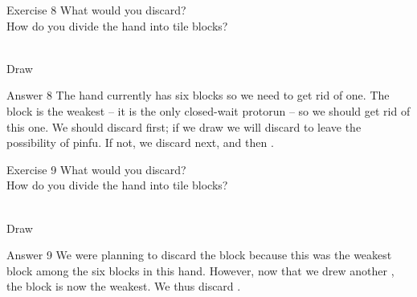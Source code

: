\bigskip

\begin{itembox}[l]{Exercise 8}
What would you discard? \\
\vsp
How do you divide the hand into tile blocks? 

\bp
{}~\\
\hfill\footnotesize{Draw~~~~~~~~~~~}
\ep
\end{itembox}

\newpage

\begin{itembox}[r]{Answer 8}
\emj
The hand currently has six blocks so we need to get rid of one. The {\LARGE{}} block is the weakest -- it is the only closed-wait protorun -- so we should get rid of this one. We should discard {\LARGE{}} first; if we draw {\LARGE{}} we will discard {\LARGE{}} to leave the possibility of {\jap pinfu}. If not, we discard {\LARGE{}} next, and then  {\LARGE{}}. 
\end{itembox}

\vfill

\begin{itembox}[l]{Exercise 9}
What would you discard? \\
\vsp
How do you divide the hand into tile blocks? 

\bp
{}\bai\bai~\\
\hfill\footnotesize{Draw~~~~~~~~~~~}
\ep
\end{itembox}

\newpage

\begin{itembox}[r]{Answer 9}
\emj
We were planning to discard the {\LARGE{}} block because this was the weakest block among the six blocks in this hand. However, now that we drew another {\LARGE{}}, the {\LARGE{}} block is now the weakest. We thus discard {\LARGE{}}.
\end{itembox}

